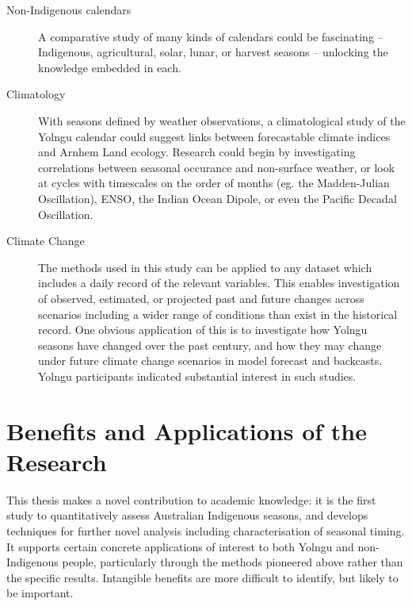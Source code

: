 \begin{description}
\item[Non-Indigenous calendars]
    A comparative study of many kinds of calendars could be fascinating --
    Indigenous, agricultural, solar, lunar, or harvest seasons -- unlocking
    the knowledge embedded in each.

\item[Climatology]
    With seasons defined by weather observations, a climatological study of the
    Yolngu calendar could suggest links between forecastable climate indices
    and Arnhem Land ecology.  Research could begin by investigating correlations
    between seasonal occurance and non-surface weather, or look at cycles with
    timescales on the order of months (eg. the Madden-Julian Oscillation), ENSO,
    the Indian Ocean Dipole, or even the Pacific Decadal Oscillation.

\item[Climate Change]
    The methods used in this study can be applied to any dataset which
    includes a daily record of the relevant variables.  This enables
    investigation of observed, estimated, or projected past and future changes
    across scenarios including a wider range of conditions than exist in the historical record.
    One obvious application of this is to investigate how Yolngu seasons have
    changed over the past century, and how they may change under future climate
    change scenarios in model forecast and backcasts.  Yolngu participants
    indicated substantial interest in such studies.
\end{description}



\section{Benefits and Applications of the Research}
\label{sec:applications-benefits}


This thesis makes a novel contribution to academic knowledge: it is the
first study to quantitatively assess Australian Indigenous seasons, and
develops techniques for further novel analysis including characterisation
of seasonal timing.
%
It supports certain concrete applications of interest to both Yolngu and
non-Indigenous people, particularly through the methods pioneered above
rather than the specific results.  Intangible benefits are more difficult
to identify, but likely to be important.


